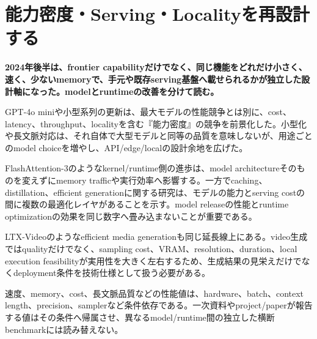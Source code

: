 \section{能力密度・Serving・Localityを再設計する}
\label{pkg:efficiency-serving}
\noindent\textbf{2024年後半は、frontier capabilityだけでなく、同じ機能をどれだけ小さく、速く、少ないmemoryで、手元や既存serving基盤へ載せられるかが独立した設計軸になった。modelとruntimeの改善を分けて読む。}\autocite{src-031c86eaad2b,src-3aa7f9dab810}

GPT-4o miniや小型系列の更新は、最大モデルの性能競争とは別に、cost、latency、throughput、localityを含む『能力密度』の競争を前景化した。小型化や長文脈対応は、それ自体で大型モデルと同等の品質を意味しないが、用途ごとのmodel choiceを増やし、API/edge/localの設計余地を広げた。\autocite{src-031c86eaad2b,src-ec05e05a8071,src-f086061a9e86}


FlashAttention-3のようなkernel/runtime側の進歩は、model architectureそのものを変えずにmemory trafficや実行効率へ影響する。一方でcaching、distillation、efficient generationに関する研究は、モデルの能力とserving costの間に複数の最適化レイヤがあることを示す。model releaseの性能とruntime optimizationの効果を同じ数字へ畳み込まないことが重要である。\autocite{src-3aa7f9dab810,src-ecac5d71389f,src-ee43656ed6da,src-fc4f100c5e5a}


LTX-Videoのようなefficient media generationも同じ延長線上にある。video生成ではqualityだけでなく、sampling cost、VRAM、resolution、duration、local execution feasibilityが実用性を大きく左右するため、生成結果の見栄えだけでなくdeployment条件を技術仕様として扱う必要がある。\autocite{src-fd5d0edaf394}


\begin{claimboundary}
速度、memory、cost、長文脈品質などの性能値は、hardware、batch、context length、precision、samplerなど条件依存である。一次資料やproject/paperが報告する値はその条件へ帰属させ、異なるmodel/runtime間の独立した横断benchmarkには読み替えない。\autocite{src-3aa7f9dab810}
\end{claimboundary}
